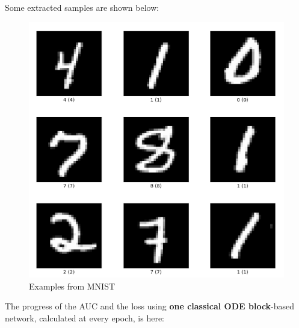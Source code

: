 \documentclass[12pt,a4paper]{report}
\begin{document}
Some extracted samples are shown below:

\begin{figure}[th]
  \centering
  \includegraphics[scale=0.65]{./pics/mnist.png}
  \caption[Examples from MNIST]{Examples from MNIST\protect\footnotemark}
  \label{fig:p14}
\end{figure}

The progress of the AUC and the loss using \textbf{one classical ODE block}-based network, calculated at every epoch, is here:
\end{document}
